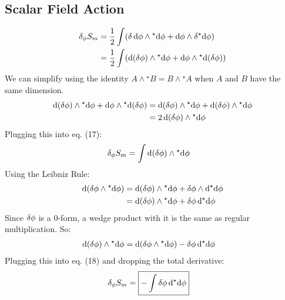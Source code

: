 \documentclass[12pt]{article}
\newcommand{\hodge}{{^\star}}
\begin{document}
\subsection{Scalar Field Action}
\begin{align}
  \var_\phi{S_m} &= \frac{1}{2} \int (\var{\dd{\phi}} \wedge \hodge{\dd{\phi}} + \dd{\phi} \wedge \var{\hodge{\dd{\phi}}}) \nonumber \\
  &= \frac{1}{2} \int (\dd(\var{\phi}) \wedge \hodge{\dd{\phi}} + \dd{\phi} \wedge \hodge{\dd(\var{\phi})})
\end{align}
We can simplify using the identity $A \wedge \hodge B = B \wedge \hodge A$ when $A$ and $B$ have the same dimension.
\begin{align*}
  \dd(\var{\phi}) \wedge \hodge{\dd{\phi}} + \dd{\phi} \wedge \hodge{\dd(\var{\phi})} &= \dd(\var{\phi}) \wedge \hodge{\dd{\phi}} + \dd(\var{\phi}) \wedge \hodge{\dd{\phi}} \\
  &= 2\dd(\var{\phi}) \wedge \hodge{\dd{\phi}}
\end{align*}
Plugging this into eq. (17):
\begin{align}
  \var_\phi{S_m} &= \int \dd(\var{\phi}) \wedge \hodge{\dd{\phi}}
\end{align}
Using the Leibniz Rule:
\begin{align*}
  \dd(\var{\phi} \wedge \hodge{\dd{\phi}}) &= \dd(\var{\phi}) \wedge \hodge{\dd{\phi}} + \var{\phi} \wedge \dd{\hodge{\dd{\phi}}} \\
  &= \dd(\var{\phi}) \wedge \hodge{\dd{\phi}} + \var{\phi}\dd{\hodge{\dd{\phi}}}
\end{align*}
Since $\var{\phi}$ is a 0-form, a wedge product with it is the same as regular multiplication. So:
\begin{align*}
  \dd(\var{\phi}) \wedge \hodge{\dd{\phi}} &= \dd(\var{\phi} \wedge \hodge{\dd{\phi}}) - \var{\phi}\dd{\hodge{\dd{\phi}}}
\end{align*}
Plugging this into eq. (18) and dropping the total derivative:
\begin{align}
  \var_\phi{S_m} &= \boxed{- \int \var{\phi}\dd{\hodge{\dd{\phi}}}}
\end{align}
\end{document}
